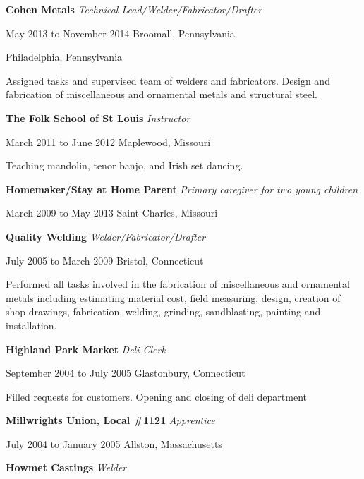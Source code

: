 \documentclass[9pt]{extarticle}
\begin{document}
\hfill

\textbf{Cohen Metals} \hfill \textit{Technical Lead/Welder/Fabricator/Drafter}

May 2013 to November 2014 \hfill Broomall, Pennsylvania

\hfill Philadelphia, Pennsylvania

\hfill

 Assigned tasks and supervised team of welders and fabricators.
 Design and fabrication of miscellaneous and ornamental metals and structural steel.

\hfill

\textbf{The Folk School of St Louis} \hfill \textit{Instructor}

March 2011 to June 2012 \hfill Maplewood, Missouri

\hfill

Teaching mandolin, tenor banjo, and Irish set dancing.

\hfill

\textbf{Homemaker/Stay at Home Parent} \hfill \textit{Primary caregiver for two young children}

March 2009 to May 2013 \hfill Saint Charles, Missouri

\hfill

\textbf{Quality Welding} \hfill \textit{Welder/Fabricator/Drafter}

July 2005 to March 2009 \hfill Bristol, Connecticut

\hfill

Performed all tasks involved in the fabrication of miscellaneous and ornamental metals including estimating material cost, field
measuring, design, creation of shop drawings, fabrication, welding, grinding, sandblasting, painting and installation.

\hfill

\textbf{Highland Park Market} \hfill \textit{Deli Clerk}

September 2004 to July 2005 \hfill Glastonbury, Connecticut

\hfill

Filled requests for customers. Opening and closing of deli department

\hfill

\textbf{Millwrights Union, Local \#1121} \hfill \textit{Apprentice} 

July 2004 to January 2005 \hfill Allston, Massachusetts

\hfill

\textbf{Howmet Castings} \hfill \textit{Welder}
\end{document}
